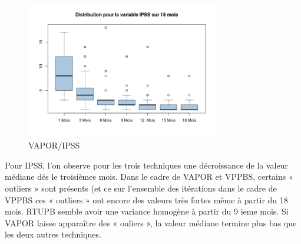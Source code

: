 \begin{figure}[H]
\centering
\includegraphics[width=0.75\textwidth]{../Fig/VAPOR/vapor-boxplot-post-ipss}
\caption{VAPOR/IPSS}
\end{figure}

%

Pour IPSS, l’on observe pour les trois techniques une décroissance de la valeur médiane dés le troisièmes mois. Dans le cadre de VAPOR et VPPBS, certains « outliers » sont présents (et ce sur l’ensemble des itérations dans le cadre de VPPBS ces « outliers » ont encore des valeurs très fortes même à partir du 18 mois.  RTUPB  semble avoir une variance homogène à partir du 9 ieme mois. Si VAPOR laisse apparaître des « ouliers », la valeur médiane termine plus bas que les deux autres techniques. 
